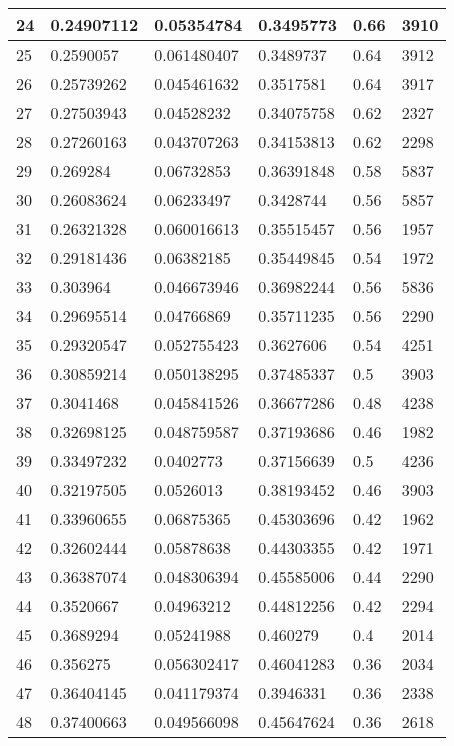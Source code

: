 \begin{longtable}{|l|l|l|l|l|l|}
24 & 0.24907112 & 0.05354784 & 0.3495773 & 0.66 & 3910 \\ \hline 
25 & 0.2590057 & 0.061480407 & 0.3489737 & 0.64 & 3912 \\ \hline 
26 & 0.25739262 & 0.045461632 & 0.3517581 & 0.64 & 3917 \\ \hline 
27 & 0.27503943 & 0.04528232 & 0.34075758 & 0.62 & 2327 \\ \hline 
28 & 0.27260163 & 0.043707263 & 0.34153813 & 0.62 & 2298 \\ \hline 
29 & 0.269284 & 0.06732853 & 0.36391848 & 0.58 & 5837 \\ \hline 
30 & 0.26083624 & 0.06233497 & 0.3428744 & 0.56 & 5857 \\ \hline 
31 & 0.26321328 & 0.060016613 & 0.35515457 & 0.56 & 1957 \\ \hline 
32 & 0.29181436 & 0.06382185 & 0.35449845 & 0.54 & 1972 \\ \hline 
33 & 0.303964 & 0.046673946 & 0.36982244 & 0.56 & 5836 \\ \hline 
34 & 0.29695514 & 0.04766869 & 0.35711235 & 0.56 & 2290 \\ \hline 
35 & 0.29320547 & 0.052755423 & 0.3627606 & 0.54 & 4251 \\ \hline 
36 & 0.30859214 & 0.050138295 & 0.37485337 & 0.5 & 3903 \\ \hline 
37 & 0.3041468 & 0.045841526 & 0.36677286 & 0.48 & 4238 \\ \hline 
38 & 0.32698125 & 0.048759587 & 0.37193686 & 0.46 & 1982 \\ \hline 
39 & 0.33497232 & 0.0402773 & 0.37156639 & 0.5 & 4236 \\ \hline 
40 & 0.32197505 & 0.0526013 & 0.38193452 & 0.46 & 3903 \\ \hline 
41 & 0.33960655 & 0.06875365 & 0.45303696 & 0.42 & 1962 \\ \hline 
42 & 0.32602444 & 0.05878638 & 0.44303355 & 0.42 & 1971 \\ \hline 
43 & 0.36387074 & 0.048306394 & 0.45585006 & 0.44 & 2290 \\ \hline 
44 & 0.3520667 & 0.04963212 & 0.44812256 & 0.42 & 2294 \\ \hline 
45 & 0.3689294 & 0.05241988 & 0.460279 & 0.4 & 2014 \\ \hline 
46 & 0.356275 & 0.056302417 & 0.46041283 & 0.36 & 2034 \\ \hline 
47 & 0.36404145 & 0.041179374 & 0.3946331 & 0.36 & 2338 \\ \hline 
48 & 0.37400663 & 0.049566098 & 0.45647624 & 0.36 & 2618 \\ \hline 

\end{longtable}
